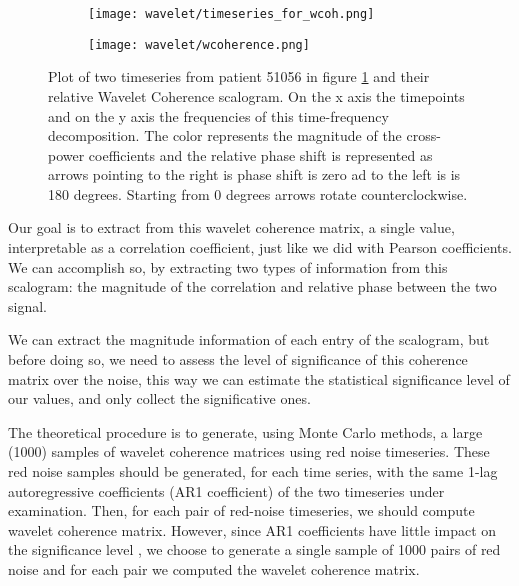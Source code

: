 \documentclass[10pt]{report}
\begin{document}
\begin{figure}
\begin{subfigure}{0.5\textwidth}
\texttt{[image: wavelet/timeseries\_for\_wcoh.png]}
\caption{}
\label{fig:wcoherence_timeseries}
\end{subfigure}
\begin{subfigure}{0.5\textwidth}
\texttt{[image: wavelet/wcoherence.png]}
\caption{}
\label{fig:wcoherence_scalogram}
\end{subfigure}
\caption{Plot of two timeseries from patient 51056 in figure \ref{fig:wcoherence_timeseries} and their relative Wavelet Coherence scalogram.
On the x axis the timepoints and on the y axis the frequencies of this time-frequency decomposition.
The color represents the magnitude of the cross-power coefficients and the relative phase shift is represented as arrows pointing to the right is phase shift is zero ad to the left is is 180 degrees. Starting from 0 degrees arrows rotate counterclockwise.
}
\label{fig:wcoherence}
\end{figure}



Our goal is to extract from this wavelet coherence matrix, a single value, interpretable as a correlation coefficient, just like we did with Pearson coefficients.
We can accomplish so, by extracting two types of information from this scalogram: the magnitude of the correlation and relative phase between the two signal.

We can extract the magnitude information of each entry of the scalogram, but before doing so, we need to assess the level of significance of this coherence matrix over the noise, this way we can estimate the statistical significance level of our values, and only collect the significative ones.

The theoretical procedure \cite{grinsted-2004} \cite{bernas-2018} is to generate, using Monte Carlo methods, a large (1000) samples of wavelet coherence matrices using red noise timeseries. \cite{hartmann-2014}
These red noise samples should be generated, for each time series, with the same 1-lag autoregressive coefficients (AR1 coefficient) of the two timeseries under examination.
Then, for each pair of red-noise timeseries, we should compute wavelet coherence matrix.
However, since AR1 coefficients have little impact on the significance level \cite{grinsted-2004}, we choose to generate a single sample of 1000 pairs of red noise and for each pair we computed the wavelet coherence matrix.
\end{document}
